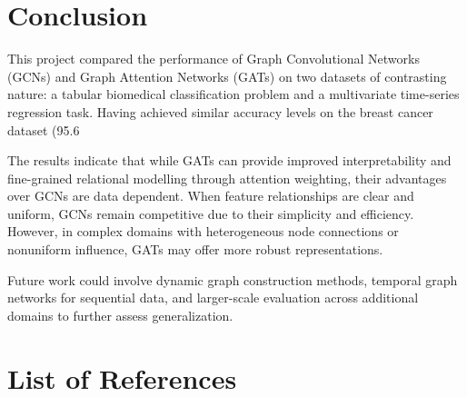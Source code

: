 \documentclass[12pt]{article}
\begin{document}
\pagebreak
\section{Conclusion}
This project compared the performance of Graph Convolutional Networks (GCNs) and Graph Attention Networks (GATs) on two datasets of contrasting nature: a tabular biomedical classification problem and a multivariate time-series regression task. Having achieved similar accuracy levels on the breast cancer dataset (95.6%

The results indicate that while GATs can provide improved interpretability and fine-grained relational modelling through attention weighting, their advantages over GCNs are data dependent. When feature relationships are clear and uniform, GCNs remain competitive due to their simplicity and efficiency. However, in complex domains with heterogeneous node connections or nonuniform influence, GATs may offer more robust representations.

Future work could involve dynamic graph construction methods, temporal graph networks for sequential data, and larger-scale evaluation across additional domains to further assess generalization.

\pagebreak
\section*{List of References}
\renewcommand{\thepage}{R-\arabic{page}}
\printbibliography[heading=none]

\end{document}
